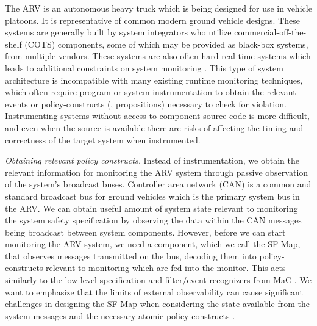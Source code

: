 The ARV is an autonomous heavy truck which is being designed for use in vehicle platoons. It is representative of common modern ground vehicle designs. These systems are generally built by system integrators who utilize commercial-off-the-shelf (COTS) components, some of which may be provided as black-box systems, from multiple vendors.
These systems are also often hard real-time systems which leads to additional constraints on system monitoring \cite{Goodloe2010}. 
This type of system architecture is incompatible with many existing runtime monitoring techniques, which often require program or system instrumentation \cite{Havelund2004, Chen2003, Bonakdarpour2012,Kim2004} to obtain the relevant events or policy-constructs (\eg, propositions) necessary to check for violation. 
Instrumenting systems without access to component source code is more difficult, and even when the source is available there are risks of affecting the timing and correctness of the target system when instrumented.

\textit{Obtaining relevant policy constructs.}
Instead of instrumentation, we obtain the relevant information for monitoring the ARV system through passive observation of the system's broadcast buses. %
Controller area network (CAN) is a common and standard broadcast bus for ground vehicles which is the primary system bus in the ARV. We can obtain useful amount of system state relevant to monitoring the system safety specification by observing the data within the CAN messages being broadcast between system components.
However, before we can start monitoring the ARV system, we need a component, which we call the \textsf{SF Map}, that observes messages transmitted on the bus, decoding them into policy-constructs relevant to monitoring which are fed into the monitor. 
This acts similarly to the low-level specification and filter/event recognizers from MaC \cite{Kim2004}.
We want to emphasize that the limits of external observability can cause significant challenges  in designing the \textsf{SF Map} when considering the state available from the system messages and the necessary atomic policy-constructs \cite{Kane2014}.

